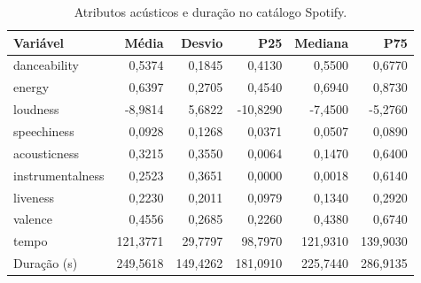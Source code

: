 \begin{table}[htbp]\centering\small
\caption{Atributos acústicos e duração no catálogo Spotify.}\label{tab:acusticas}
\begin{tabular}{lrrrrr}\toprule
Variável & Média & Desvio & P25 & Mediana & P75 \\\midrule
danceability & 0,5374 & 0,1845 & 0,4130 & 0,5500 & 0,6770 \\
energy & 0,6397 & 0,2705 & 0,4540 & 0,6940 & 0,8730 \\
loudness & -8,9814 & 5,6822 & -10,8290 & -7,4500 & -5,2760 \\
speechiness & 0,0928 & 0,1268 & 0,0371 & 0,0507 & 0,0890 \\
acousticness & 0,3215 & 0,3550 & 0,0064 & 0,1470 & 0,6400 \\
instrumentalness & 0,2523 & 0,3651 & 0,0000 & 0,0018 & 0,6140 \\
liveness & 0,2230 & 0,2011 & 0,0979 & 0,1340 & 0,2920 \\
valence & 0,4556 & 0,2685 & 0,2260 & 0,4380 & 0,6740 \\
tempo & 121,3771 & 29,7797 & 98,7970 & 121,9310 & 139,9030 \\
Duração (s) & 249,5618 & 149,4262 & 181,0910 & 225,7440 & 286,9135 \\
\bottomrule\end{tabular}
\end{table}
